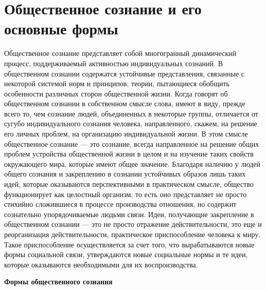 \documentclass[12pt]{article}
\begin{document}
\section{Общественное сознание и его основные формы}
Общественное  сознание  представляет  собой  многогранный  динамический  процесс,  поддерживаемый
активностью  индивидуальных  сознаний.  В  общественном  сознании  содержатся  устойчивые  представления,
связанные с некоторой системой норм и принципов, теории, пытающиеся обобщить особенности различных
сторон общественной жизни. Когда говорят об общественном сознании в собственном смысле слова, имеют в
виду,  прежде  всего  то,  чем  сознание  людей,  объединенных  в  некоторые  группы,  отличается  от  сугубо
индивидуального сознания человека, направленного, скажем, на решение его личных проблем, на организацию
индивидуальной  жизни.  В  этом  смысле  общественное  сознание  —  это  сознание,  всегда  направленное  на
решение общих проблем устройства общественной жизни в целом и на изучение таких свойств окружающего
мира, которые имеют общее значение.
Благодаря наличию у людей общего сознания и закреплению в сознании устойчивых образов лишь таких идей,
которые  оказываются  перспективными  в  практическом  смысле,  общество  функционирует  как  целостный
организм, то есть оно представляет не просто стихийно сложившиеся в процессе производства отношения, но
содержит сознательно упорядочиваемые людьми связи.
Идеи, получающие закрепление в общественном сознании — это не просто отражение действительности, это
еще и реорганизация действительности, практическое приспособление человека к миру. Такое приспособление
осуществляется  за  счет  того,  что  вырабатываются  новые  формы  социальной  связи,  утверждаются  новые
социальные нормы и те идеи, которые оказываются необходимыми для их воспроизводства.

\textbf{Формы общественного сознания}
\end{document}
